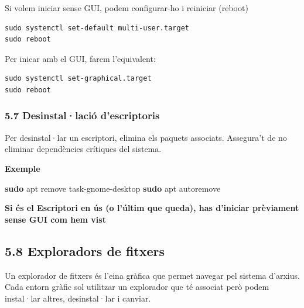 \documentclass[
  catalan,
  a4paper,
]{article}
\newenvironment{Shaded}{\begin{snugshade}}{\end{snugshade}}
\newcommand{\FunctionTok}[1]{\textcolor[rgb]{0.13,0.29,0.53}{\textbf{#1}}}
\newcommand{\NormalTok}[1]{#1}
\begin{document}
Si volem iniciar sense GUI, podem configurar-ho i reiniciar (reboot)

\begin{verbatim}
sudo systemctl set-default multi-user.target
sudo reboot
\end{verbatim}

Per inicar amb el GUI, farem l'equivalent:

\begin{verbatim}
sudo systemctl set-graphical.target
sudo reboot
\end{verbatim}

\subsubsection{5.7 Desinstal·lació
d'escriptoris}\label{desinstallaciuxf3-descriptoris}

Per desinstal·lar un escriptori, elimina els paquets associats.
Assegura't de no eliminar dependències crítiques del sistema.

\textbf{Exemple}

\begin{Shaded}
\begin{Highlighting}[]
   \FunctionTok{sudo}\NormalTok{ apt remove task{-}gnome{-}desktop}
   \FunctionTok{sudo}\NormalTok{ apt autoremove}
\end{Highlighting}
\end{Shaded}

\textbf{Si és el Escriptori en ús (o l'últim que queda), has d'iniciar
prèviament sense GUI com hem vist}

\subsection{5.8 Exploradors de fitxers}\label{exploradors-de-fitxers}

Un explorador de fitxers és l'eina gràfica que permet navegar pel
sistema d'arxius. Cada entorn gràfic sol utilitzar un explorador que té
associat però podem instal·lar altres, desinstal·lar i canviar.
\end{document}
